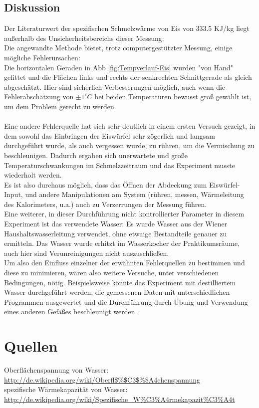 \documentclass[12pt,a4paper]{article}
\begin{document}
\begin{multicols}{2}
\subsection{Diskussion}
Der Literaturwert der spezifischen Schmelzwärme von Eis von 333.5 KJ/kg liegt außerhalb des Unsicherheitsbereichs dieser Messung:\\
Die angewandte Methode bietet, trotz computergestützter Messung, einige mögliche Fehlerursachen:\\
Die horizontalen Geraden in Abb \ref{fig:Tempverlauf-Eis} wurden "von Hand" gefittet und die Flächen links und rechts der senkrechten Schnittgerade als gleich abgeschätzt. Hier sind sicherlich Verbesserungen möglich, auch wenn die Fehlerabschätzung von $\pm 1 ^\circ C$ bei beiden Temperaturen bewusst groß gewählt ist, um dem Problem gerecht zu werden.\\
\\
Eine andere Fehlerquelle hat sich sehr deutlich in einem ersten Versuch gezeigt, in dem sowohl das Einbringen der Eiswürfel sehr zögerlich und langsam durchgeführt wurde, als auch vergessen wurde, zu rühren, um die Vermischung zu beschleunigen. Dadurch ergaben sich unerwartete und große Temperaturschwankungen im Schmelzzeitraum und das Experiment musste wiederholt werden.\\
Es ist also durchaus möglich, dass das Öffnen der Abdeckung zum Eiswürfel-Input, und andere Manipulationen am System (rühren, messen, Wärmeleitung des Kalorimeters, u.a.) auch zu Verzerrungen der Messung führen.\\
Eine weiterer, in dieser Durchführung nicht kontrollierter Parameter in diesem Experiment ist das verwendete Wasser: Es wurde Wasser aus der Wiener Haushaltswasserleitung verwendet, ohne etwaige Bestandteile genauer zu ermitteln. Das Wasser wurde erhitzt im Wasserkocher der Praktikumsräume, auch hier sind Verunreinigungen nicht auszuschließen.\\
Um also den Einfluss einzelner der erwähnten Fehlerquellen zu bestimmen und diese zu minimieren, wären also weitere Versuche, unter verschiedenen Bedingungen, nötig. Beispielsweise könnte das Experiment mit destilliertem Wasser durchgeführt werden, die gemessenen Daten mit unterschiedlichen Programmen ausgewertet und die Durchführung durch Übung und Verwendung eines anderen Gefäßes beschleunigt werden.


\section{Quellen}
\noindent Oberflächenspannung von Wasser:\\
\url{http://de.wikipedia.org/wiki/Oberfl$\%$C3$\%$A4chenspannung}\\
\noindent spezifische Wärmekapazität von Wasser:\\
\url{http://de.wikipedia.org/wiki/Spezifische_W%C3%A4rmekapazit%C3%A4t}

\end{multicols}
\end{document}
